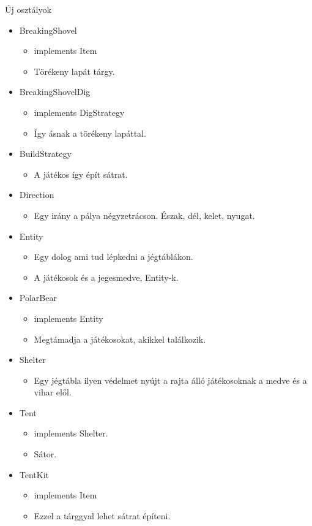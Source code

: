 Új osztályok
\begin{itemize}
\item BreakingShovel
	\begin{itemize}
	\item implements Item
	\item Törékeny lapát tárgy.
	\end{itemize}
\item BreakingShovelDig
	\begin{itemize}
	\item implements DigStrategy
	\item Így ásnak a törékeny lapáttal.
	\end{itemize}
\item BuildStrategy
	\begin{itemize}
	\item A játékos így épít sátrat.
	\end{itemize}
\item Direction
	\begin{itemize}
	\item Egy irány a pálya négyzetrácson. Észak, dél, kelet, nyugat.
	\end{itemize}
\item Entity
	\begin{itemize}
	\item Egy dolog ami tud lépkedni a jégtáblákon.
	\item A játékosok és a jegesmedve, Entity-k.
	\end{itemize}
\item PolarBear
	\begin{itemize}
	\item implements Entity
	\item Megtámadja a játékosokat, akikkel találkozik.
	\end{itemize}
\item Shelter
	\begin{itemize}
	\item Egy jégtábla ilyen védelmet nyújt a rajta álló játékosoknak a medve és a vihar elől.
	\end{itemize}
\item Tent
	\begin{itemize}
	\item implements Shelter.
	\item Sátor.
	\end{itemize}
\item TentKit
	\begin{itemize}
	\item implements Item
	\item Ezzel a tárggyal lehet sátrat építeni.
	\end{itemize}
\end{itemize}

